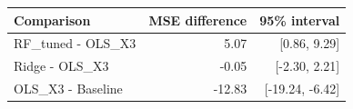 \begin{tabular}{lrr}
\toprule
Comparison & MSE difference & 95\% interval \\
\midrule
RF\_tuned - OLS\_X3 & 5.07 & [0.86, 9.29] \\
Ridge - OLS\_X3 & -0.05 & [-2.30, 2.21] \\
OLS\_X3 - Baseline & -12.83 & [-19.24, -6.42] \\
\bottomrule
\end{tabular}
